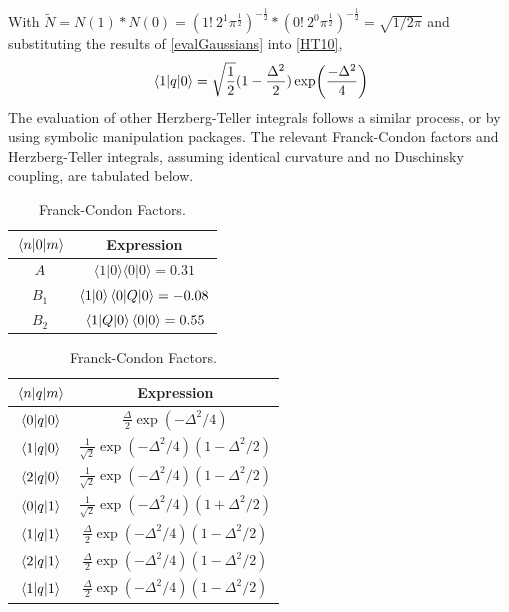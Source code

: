 \documentclass[aip, jcp, reprint, onecolumn, nofootinbib]{revtex4-2}
\begin{document}
With $\tilde{N} = N(1)*N(0) = (1! \ 2^1 \pi^{\frac{1}{2}})^{-\frac{1}{2}} * (0! \ 2^0 \pi^{\frac{1}{2}})^{-\frac{1}{2}} = \sqrt{1/2\pi}$ and substituting the results of \autoref{evalGaussians} into \autoref{HT10}, 
\begin{equation}
	\mel{1}{q}{0} = \sqrt{\frac{1}{2}} (1 - \frac{\Delta^2}{2}) \exp(\frac{-\Delta^2}{4})
\end{equation}
The evaluation of other Herzberg-Teller integrals follows a similar process, or by using symbolic manipulation packages. 
The relevant Franck-Condon factors and Herzberg-Teller integrals, assuming identical curvature and no Duschinsky coupling, are tabulated below.

\begin{table}[!htbp]
	\caption{\label{T:FC Integral} Franck-Condon Factors.}
	\begin{ruledtabular}
		\begin{tabular}{cc}
			$\mel{n}{0}{m}$ & Expression\\
			\hline  
			$A$ & $\langle 1 | 0 \rangle \langle 0 | 0 \rangle = 0.31 $  \\
			
			$B_1$ & $\langle 1 | 0 \rangle \mel{0}{Q}{0} = -0.08$ \\
			
			$B_2$ & $\mel{1}{Q}{0} \langle 0 | 0 \rangle = 0.55$\\
		\end{tabular}
	\end{ruledtabular}
\end{table}

\begin{table}[!htbp]
	\caption{\label{T:HT Integral} Franck-Condon Factors.}
	\begin{ruledtabular}
		\begin{tabular}{cc}
			$\mel{n}{q}{m}$& Expression\\
			\hline  
			$\mel{0}{q}{0}$ & $\frac{\Delta}{2} \exp(-\Delta^2/4)$  \\ 
			$\mel{1}{q}{0}$ & $\frac{1}{\sqrt{2}} \exp(-\Delta^2/4)(1 - \Delta^2/2) $ \\
			$\mel{2}{q}{0}$ & $\frac{1}{\sqrt{2}} \exp(-\Delta^2/4)(1 - \Delta^2/2) $ \\
			$\mel{0}{q}{1}$ & $\frac{1}{\sqrt{2}} \exp(-\Delta^2/4)(1 + \Delta^2/2) $ \\
			$\mel{1}{q}{1}$ & $\frac{\Delta}{{2}} \exp(-\Delta^2/4)(1 - \Delta^2/2) $ \\
			$\mel{2}{q}{1}$ & $\frac{\Delta}{{2}} \exp(-\Delta^2/4)(1 - \Delta^2/2) $ \\
			$\mel{1}{q}{1}$ & $\frac{\Delta}{{2}} \exp(-\Delta^2/4)(1 - \Delta^2/2) $ \\

		\end{tabular}
	\end{ruledtabular}
\end{table}
\end{document}
